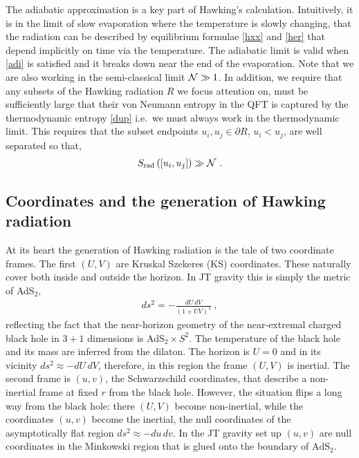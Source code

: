 \documentclass[12pt]{article}
\newcommand{\EQ}[1]{\begin{equation}\begin{split} #1
\end{split}\end{equation}}
\begin{document}
The adiabatic approximation is a key part of Hawking's calculation. Intuitively, it is  in the limit of slow evaporation  where  the temperature is slowly changing, that  the radiation can be described by equilibrium formulae  \eqref{hxx} and  \eqref{her} that depend implicitly on  time via the temperature. The adiabatic limit is valid when \eqref{adi} is satisfied and it breaks down near the end of the evaporation. Note that we are also working in the semi-classical limit ${\cal N}\gg1$. In addition, we require that any subsets of the  Hawking radiation $R$ we focus attention on, must be sufficiently large that their  von Neumann entropy in the QFT is captured by the thermodynamic entropy \eqref{dup} i.e.~we must always work in the thermodynamic limit. This requires that the subset endpoints $u_i,u_j\in\partial R$, $u_i<u_j$, are well separated  so that,
\EQ{
	S_\text{rad}\left([u_i,u_j]\right)\gg{\cal N}\ .
	\label{ab2}
} 

\subsection{Coordinates and the generation of Hawking radiation}

At its heart the generation of Hawking radiation is the tale of two coordinate frames. The first $(U,V)$ are  Kruskal Szekeres (KS) coordinates. These naturally cover both inside and outside the horizon. In JT gravity this is simply the metric of AdS$_2$,
\EQ{
ds^2=-\frac{dU\,dV}{(1+UV)^2}\ ,
\label{zik}
}
reflecting the fact that the near-horizon geometry of the near-extremal charged black hole in $3+1$ dimensions is AdS$_2\times S^2$. The temperature of the black hole and its mass are inferred from the dilaton. The horizon is $U=0$ and in its vicinity $ds^2\approx -dU\,dV$, therefore, in this region  the frame $(U,V)$ is inertial. The second frame is $(u,v)$, the Schwarzschild coordinates, that describe a non-inertial frame at fixed $r$ from the black hole. However, the situation flips a long way from the black hole: there $(U,V)$ become non-inertial, while the coordinates $(u,v)$ become the inertial, the null coordinates of the asymptotically flat region  $ds^2\approx -du\,dv$. In the JT gravity set up $(u,v)$ are null coordinates in the Minkowski region that is glued onto the boundary of $\text{AdS}_2$.
\end{document}

